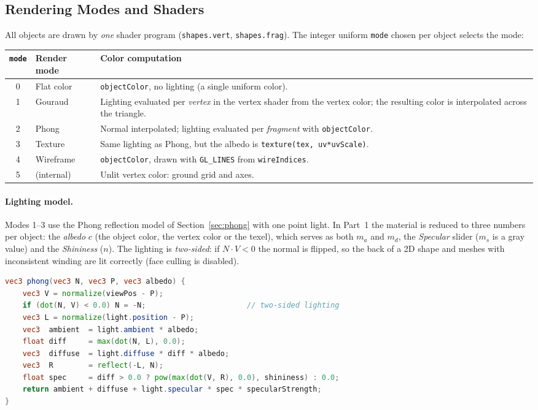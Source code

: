 \documentclass[a4paper, 11pt]{article}
\newcommand{\code}[1]{\texttt{#1}}
\begin{document}
\subsection{Rendering Modes and Shaders}\label{sec:render}

All objects are drawn by \emph{one} shader program (\code{shapes.vert}, \code{shapes.frag}). The integer uniform \code{mode}
chosen per object selects the mode:

\begin{center}
\small
\begin{tabularx}{\textwidth}{@{}cl X@{}}
\toprule
\code{mode} & \textbf{Render mode} & \textbf{Color computation}\\
\midrule
0 & Flat color & \code{objectColor}, no lighting (a single uniform color).\\
1 & Gouraud & Lighting evaluated per \emph{vertex} in the vertex shader from the vertex color; the resulting color is interpolated across the triangle.\\
2 & Phong & Normal interpolated; lighting evaluated per \emph{fragment} with \code{objectColor}.\\
3 & Texture & Same lighting as Phong, but the albedo is \code{texture(tex, uv*uvScale)}.\\
4 & Wireframe & \code{objectColor}, drawn with \code{GL\_LINES} from \code{wireIndices}.\\
5 & (internal) & Unlit vertex color: ground grid and axes.\\
\bottomrule
\end{tabularx}
\end{center}

\paragraph{Lighting model.} Modes 1--3 use the Phong reflection model of Section~\ref{sec:phong} with one point light. In Part~1 the material is
reduced to three numbers per object: the \emph{albedo} $c$ (the object color, the vertex color or the texel), which serves as both $m_a$ and $m_d$, the
\emph{Specular} slider ($m_s$ is a gray value) and the \emph{Shininess} ($n$). The lighting is \emph{two-sided}: if $N\cdot V<0$ the normal is flipped,
so the back of a 2D shape and meshes with inconsistent winding are lit correctly (face culling is disabled).

\begin{lstlisting}[language=GLSL,caption={Core of the lighting function (both shaders).}]
vec3 phong(vec3 N, vec3 P, vec3 albedo) {
    vec3 V = normalize(viewPos - P);
    if (dot(N, V) < 0.0) N = -N;                       // two-sided lighting
    vec3 L = normalize(light.position - P);
    vec3  ambient  = light.ambient * albedo;
    float diff     = max(dot(N, L), 0.0);
    vec3  diffuse  = light.diffuse * diff * albedo;
    vec3  R        = reflect(-L, N);
    float spec     = diff > 0.0 ? pow(max(dot(V, R), 0.0), shininess) : 0.0;
    return ambient + diffuse + light.specular * spec * specularStrength;
}
\end{lstlisting}
\end{document}
